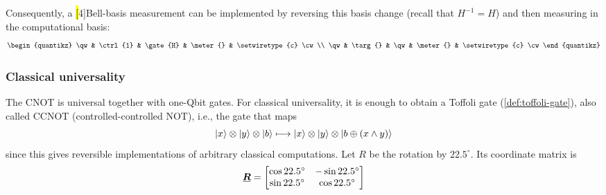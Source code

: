 Consequently, a \hl[4]{Bell-basis measurement} can be implemented by reversing this basis change (recall that $H^{-1} = H$) and then measuring in the computational basis:
\[
\begin{quantikz}
\qw & \ctrl{1} & \gate{H} & \meter{} & \setwiretype{c} \cw \\
\qw & \targ{}  & \qw      & \meter{} & \setwiretype{c} \cw
\end{quantikz}
\]

\subsubsection*{Classical universality}
\label{sec:cnot-classical-universality}

The CNOT is universal together with one-Qbit gates.
For classical universality, it is enough to obtain a Toffoli gate (\autoref{def:toffoli-gate}), 
also called CCNOT (controlled-controlled NOT), i.e., the gate that maps
\[
  \ket{x} \otimes \ket{y} \otimes \ket{b}
  \longmapsto
  \ket{x} \otimes \ket{y} \otimes\ket{b \oplus (x \wedge y)}
 \]
since this gives reversible implementations of arbitrary classical computations.
Let \(R\) be the rotation by \(22.5^\circ\). Its coordinate matrix is
\[
\matr{R}
=
\begin{bmatrix}
\cos 22.5^\circ & -\sin 22.5^\circ \\
\sin 22.5^\circ & \cos 22.5^\circ
\end{bmatrix}
\]

